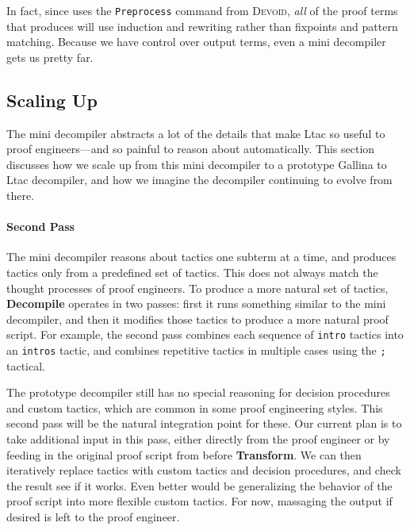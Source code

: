 In fact, since \toolname uses the \lstinline{Preprocess} command from \textsc{Devoid}, \textit{all} of the proof terms that \toolname
produces will use induction and rewriting rather than fixpoints and pattern matching.
Because we have control over output terms, even a mini decompiler gets us pretty far.


\subsection{Scaling Up}
\label{sec:second}

The mini decompiler abstracts a lot of the details that make Ltac so useful to proof engineers---and so painful to 
reason about automatically.
This section discusses how we scale up from this mini decompiler to a prototype Gallina to Ltac decompiler,
and how we imagine the decompiler continuing to evolve from there.

\paragraph{Second Pass}
The mini decompiler reasons about tactics one subterm at a time, and produces tactics only from a predefined set of tactics.
This does not always match the thought processes of proof engineers.
To produce a more natural set of tactics, \textbf{Decompile} operates in two passes: first it runs something similar to the mini decompiler, and then it modifies those tactics to produce a more natural proof script.
For example, the second pass combines each sequence of \lstinline{intro} tactics into an \lstinline{intros} tactic,
and combines repetitive tactics in multiple cases using the \lstinline{;} tactical.

The prototype decompiler still has no special reasoning for decision procedures and custom tactics, which are common
in some proof engineering styles.
This second pass will be the natural integration point for these.
Our current plan is to take additional input in this pass, either directly from the proof engineer
or by feeding in the original proof script from before \textbf{Transform}.
We can then iteratively replace tactics with custom tactics and decision procedures, and check the result see if it works.
Even better would be generalizing the behavior of the proof script into more flexible custom tactics.
For now, massaging the output if desired is left to the proof engineer.

